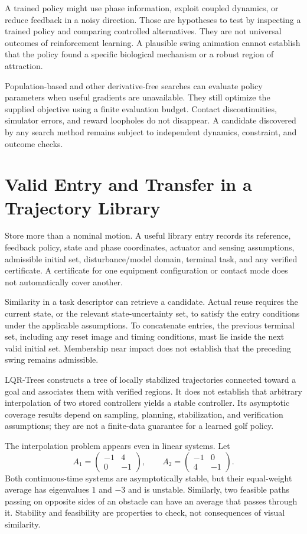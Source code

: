 A trained policy might use phase information, exploit coupled dynamics, or reduce feedback in a noisy direction. Those are hypotheses to test by inspecting a trained policy and comparing controlled alternatives. They are not universal outcomes of reinforcement learning. A plausible swing animation cannot establish that the policy found a specific biological mechanism or a robust region of attraction.

Population-based and other derivative-free searches can evaluate policy parameters when useful gradients are unavailable. They still optimize the supplied objective using a finite evaluation budget. Contact discontinuities, simulator errors, and reward loopholes do not disappear. A candidate discovered by any search method remains subject to independent dynamics, constraint, and outcome checks.

\section{Valid Entry and Transfer in a Trajectory Library}

Store more than a nominal motion. A useful library entry records its reference, feedback policy, state and phase coordinates, actuator and sensing assumptions, admissible initial set, disturbance/model domain, terminal task, and any verified certificate. A certificate for one equipment configuration or contact mode does not automatically cover another.

Similarity in a task descriptor can retrieve a candidate. Actual reuse requires the current state, or the relevant state-uncertainty set, to satisfy the entry conditions under the applicable assumptions. To concatenate entries, the previous terminal set, including any reset image and timing conditions, must lie inside the next valid initial set. Membership near impact does not establish that the preceding swing remains admissible.

LQR-Trees constructs a tree of locally stabilized trajectories connected toward a goal and associates them with verified regions. It does not establish that arbitrary interpolation of two stored controllers yields a stable controller. Its asymptotic coverage results depend on sampling, planning, stabilization, and verification assumptions; they are not a finite-data guarantee for a learned golf policy.

The interpolation problem appears even in linear systems. Let
\begin{equation}
A_1=\begin{pmatrix}-1&4\\0&-1\end{pmatrix},\qquad
A_2=\begin{pmatrix}-1&0\\4&-1\end{pmatrix}.
\end{equation}
Both continuous-time systems are asymptotically stable, but their equal-weight average has eigenvalues $1$ and $-3$ and is unstable. Similarly, two feasible paths passing on opposite sides of an obstacle can have an average that passes through it. Stability and feasibility are properties to check, not consequences of visual similarity.

